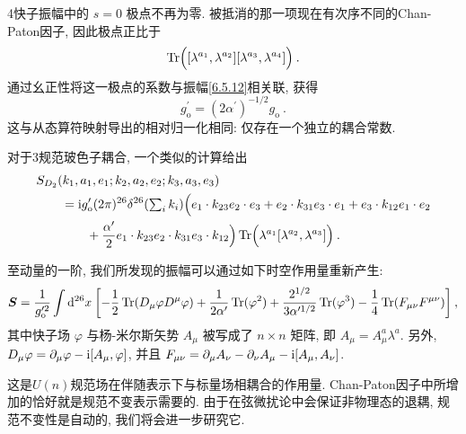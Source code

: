 4快子振幅中的 $s=0$ 极点不再为零. 被抵消的那一项现在有次序不同的Chan-Paton因子, 因此极点正比于
\begin{equation}
	\operatorname{Tr}\Bigl([\lambda^{a_{1}}, \lambda^{a_{2}}][\lambda^{a_{3}}, \lambda^{a_{4}}]\Bigr) \:. \label{6.5.13}
\end{equation}
通过幺正性将这一极点的系数与振幅\eqref{6.5.12}相关联, 获得
\begin{equation}
	g_{\mathrm{o}}^{\prime}=(2 \alpha^{\prime})^{-1 / 2} g_{\mathrm{o}} \:. \label{6.5.14}
\end{equation}
这与从态算符映射导出的相对归一化相同: 仅存在一个独立的耦合常数. 

对于3规范玻色子耦合, 一个类似的计算给出
\begin{align}
	&S_{D_{2}}(k_{1}, a_{1}, e_{1} ; k_{2}, a_{2}, e_{2} ; k_{3}, a_{3}, e_{3}) \nonumber \\
	&\qquad = \mathrm{i} g_{\mathrm{o}}^{\prime}(2 \pi)^{26} \delta^{26}({\textstyle\sum_{i} k_{i}})
	\Bigl(e_{1} \cdot k_{23} e_{2} \cdot e_{3}+e_{2} \cdot k_{31} e_{3} \cdot e_{1}+e_{3} \cdot k_{12} e_{1} \cdot e_{2} \nonumber\\
	&\qquad \qquad +\frac{\alpha^{\prime}}{2} e_{1} \cdot k_{23} e_{2} \cdot k_{31} e_{3} \cdot k_{12} \Bigr) 
	\operatorname{Tr}\Bigl(\lambda^{a_{1}}[\lambda^{a_{2}}, \lambda^{a_{3}}]\Bigr) \:. \label{6.5.15}
\end{align}

至动量的一阶, 我们所发现的振幅可以通过如下时空作用量重新产生: 
\begin{equation}
		\bm{S}=\frac{1}{g_{\mathrm{o}}^{\prime 2}} \int \mathrm{d}^{26} x\: \biggl[-\frac{1}{2} \operatorname{Tr}(D_{\mu} \varphi D^{\mu}\varphi)+\frac{1}{2 \alpha^{\prime}} \operatorname{Tr}(\varphi^{2})+\frac{2^{1 / 2}}{3 \alpha^{\prime 1 / 2}} 
		\operatorname{Tr}(\varphi^{3})
		-\frac{1}{4} \operatorname{Tr}(F_{\mu \nu} F^{\mu \nu})\biggr] \:, \label{6.5.16}
\end{equation}
其中快子场 $\varphi$ 与杨-米尔斯矢势 $A_{\mu}$ 被写成了 $n \times n$ 矩阵, 即 $A_{\mu}=A_{\mu}^{a} \lambda^{a} $. 
另外, $D_{\mu} \varphi=\partial_{\mu} \varphi-\mathrm{i}[A_{\mu}, \varphi]$, 
并且 $F_{\mu \nu}=\partial_{\mu} A_{\nu}-\partial_{\nu} A_{\mu}-\mathrm{i}[A_{\mu}, A_{\nu}]$.

这是$U(n)$规范场在伴随表示下与标量场相耦合的作用量. Chan-Paton因子中所增加的恰好就是规范不变表示需要的. 由于在弦微扰论中会保证非物理态的退耦, 规范不变性是自动的, 我们将会进一步研究它.

